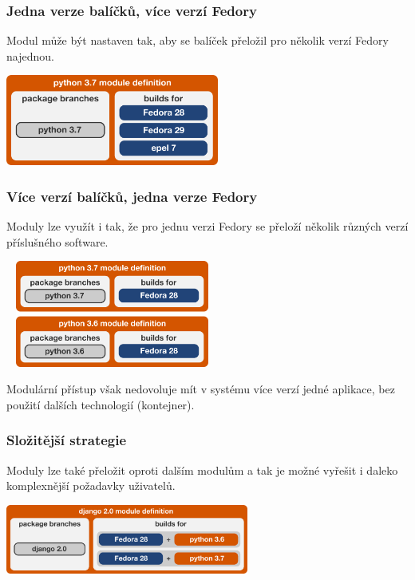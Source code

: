 \documentclass[12pt]{beamer}
\begin{document}
\begin{frame}
\frametitle{Jedna verze balíčků, více verzí Fedory}
Modul může být nastaven tak, aby se balíček přeložil pro několik verzí Fedory najednou. 

\begin{center}
	\includegraphics[width=7cm]{forversion}
\end{center}
\end{frame}

\begin{frame}
\frametitle{Více verzí balíčků, jedna verze Fedory}
Moduly lze využít i tak, že pro jednu verzi Fedory se přeloží několik různých verzí příslušného software.

\begin{center}
	\includegraphics[width=7cm, height=3.5cm]{multiversion}
\end{center}

Modulární přístup však nedovoluje mít v systému více verzí jedné aplikace, bez použití dalších technologií (kontejner).

\end{frame}

\begin{frame}
\frametitle{Složitější strategie}
Moduly lze také přeložit oproti dalším modulům a tak je možné vyřešit i daleko komplexnější požadavky uživatelů.

\begin{center}
	\includegraphics[width=8cm]{combined}
\end{center}
\end{frame}
\end{document}
